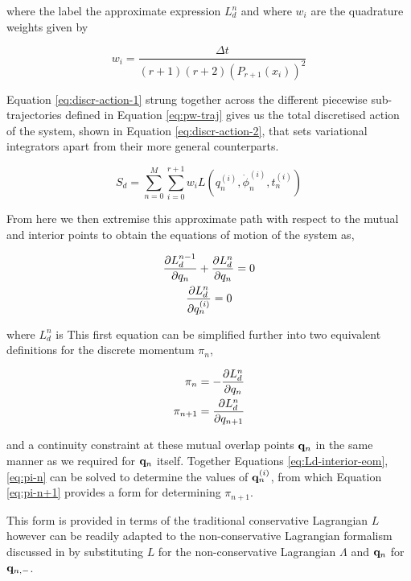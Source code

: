\documentclass[10pt]{iopart}
\begin{document}
where the label the approximate expression $L_d^n$ and where $w_i$ are the quadrature weights given by

\begin{equation}
  w_i = \frac{\Delta t}{(r + 1)(r + 2)(P_{r + 1}(x_i))^2}
\end{equation}

Equation \eqref{eq:discr-action-1} strung together across the different piecewise sub-trajectories defined in Equation \eqref{eq:pw-traj} gives us the total discretised action of the system, shown in Equation \eqref{eq:discr-action-2}, that sets variational integrators  apart from their  more general counterparts. 

\begin{equation}
\label{eq:discr-action-2}
  S_d = \sum_{n = 0}^{M} \sum_{i = 0}^{r + 1} w_i L(q_{n}^{(i)}, \dot\phi_{n}^{(i)}, t_{n}^{(i)})
\end{equation}

From here we then extremise this approximate path with respect to the mutual and interior  points to obtain the equations of motion of the system as,

\begin{gather}
	\frac{\partial L_d^{n-1}}{\partial q_n} + \frac{\partial L_d^{n}}{\partial q_n} = 0 \\
	\label{eq:Ld-interior-eom} \frac{\partial L_d^{n}}{\partial q^{(i)}_n} = 0
\end{gather}

where $L_d^{n}$ is This first equation can be simplified further into two equivalent definitions for the discrete momentum \(\pi_n\),

\begin{align}
	\label{eq:pi-n} \pi_n &= -\frac{\partial L_d^{n}}{\partial q_n} \\
	\label{eq:pi-n+1} \pi_{n + 1} &= \frac{\partial L_d^{n}}{\partial q_{n + 1}}
\end{align}

and a continuity constraint at these mutual overlap points $\vb q_n$ in the same manner as we required for $\vb q_n$ itself. Together Equations \eqref{eq:Ld-interior-eom}, \eqref{eq:pi-n} can be solved to determine the values of $\vb q^{(i)}_n$, from which Equation \eqref{eq:pi-n+1} provides a form for determining $\pi_{n + 1}$.

This form is provided in terms of the traditional conservative Lagrangian $L$ however can be readily adapted to the non-conservative Lagrangian formalism discussed in  by substituting $L$ for the non-conservative Lagrangian $\Lambda$ and $\vb q_n$ for $\vb q_{n, -}$.
\end{document}

